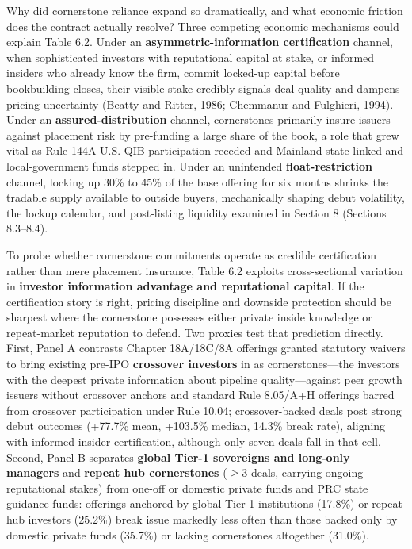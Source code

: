 \documentclass[11pt,letterpaper]{article}
\begin{document}
Why did cornerstone reliance expand so dramatically, and what economic friction does the contract actually resolve? Three competing economic mechanisms could explain Table 6.2. Under an \textbf{asymmetric-information certification} channel, when sophisticated investors with reputational capital at stake, or informed insiders who already know the firm, commit locked-up capital before bookbuilding closes, their visible stake credibly signals deal quality and dampens pricing uncertainty (Beatty and Ritter, 1986; Chemmanur and Fulghieri, 1994). Under an \textbf{assured-distribution} channel, cornerstones primarily insure issuers against placement risk by pre-funding a large share of the book, a role that grew vital as Rule 144A U.S. QIB participation receded and Mainland state-linked and local-government funds stepped in. Under an unintended \textbf{float-restriction} channel, locking up 30\% to 45\% of the base offering for six months shrinks the tradable supply available to outside buyers, mechanically shaping debut volatility, the lockup calendar, and post-listing liquidity examined in Section 8 (Sections 8.3–8.4).

To probe whether cornerstone commitments operate as credible certification rather than mere placement insurance, Table 6.2 exploits cross-sectional variation in \textbf{investor information advantage and reputational capital}. If the certification story is right, pricing discipline and downside protection should be sharpest where the cornerstone possesses either private inside knowledge or repeat-market reputation to defend. Two proxies test that prediction directly. First, Panel A contrasts Chapter 18A/18C/8A offerings granted statutory waivers to bring existing pre-IPO \textbf{crossover investors} in as cornerstones—the investors with the deepest private information about pipeline quality—against peer growth issuers without crossover anchors and standard Rule 8.05/A+H offerings barred from crossover participation under Rule 10.04; crossover-backed deals post strong debut outcomes (+77.7\% mean, +103.5\% median, 14.3\% break rate), aligning with informed-insider certification, although only seven deals fall in that cell. Second, Panel B separates \textbf{global Tier-1 sovereigns and long-only managers} and \textbf{repeat hub cornerstones} ($\ge 3$ deals, carrying ongoing reputational stakes) from one-off or domestic private funds and PRC state guidance funds: offerings anchored by global Tier-1 institutions (17.8\%) or repeat hub investors (25.2\%) break issue markedly less often than those backed only by domestic private funds (35.7\%) or lacking cornerstones altogether (31.0\%).
\end{document}
